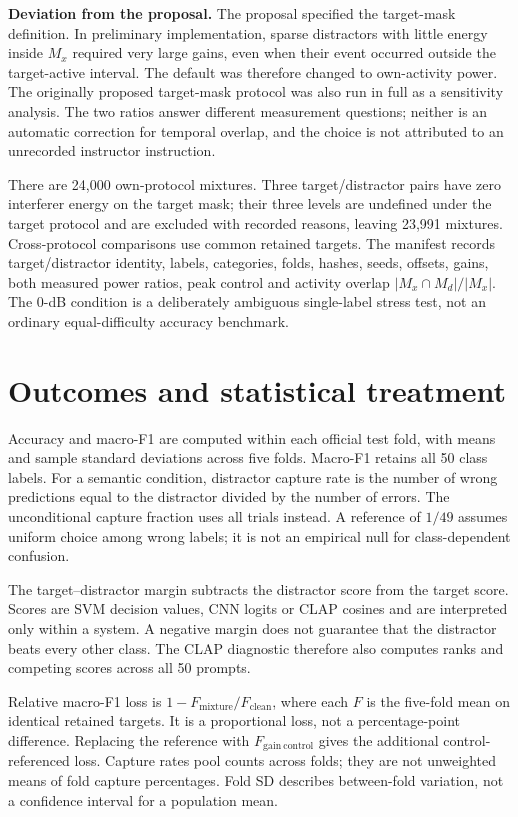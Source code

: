 \documentclass[a4paper,10pt]{article}
\begin{document}
\textbf{Deviation from the proposal.} The proposal specified the target-mask
definition. In preliminary implementation, sparse distractors with little
energy inside $M_x$ required very large gains, even when their event occurred
outside the target-active interval. The default was therefore changed to
own-activity power. The originally proposed target-mask protocol was also run
in full as a sensitivity analysis. The two ratios answer different measurement
questions; neither is an automatic correction for temporal overlap, and the
choice is not attributed to an unrecorded instructor instruction.

There are 24,000 own-protocol mixtures. Three target/distractor pairs have zero
interferer energy on the target mask; their three levels are undefined under
the target protocol and are excluded with recorded reasons, leaving 23,991
mixtures. Cross-protocol comparisons use common retained targets. The manifest
records target/distractor identity, labels, categories, folds, hashes, seeds,
offsets, gains, both measured power ratios, peak control and activity overlap
$|M_x\cap M_d|/|M_x|$. The 0-dB condition is a deliberately ambiguous
single-label stress test, not an ordinary equal-difficulty accuracy benchmark.

\section{Outcomes and statistical treatment}
Accuracy and macro-F1 are computed within each official test fold, with means
and sample standard deviations across five folds. Macro-F1 retains all 50 class
labels. For a semantic condition, distractor capture rate is the number of wrong
predictions equal to the distractor divided by the number of errors. The
unconditional capture fraction uses all trials instead. A reference of $1/49$
assumes uniform choice among wrong labels; it is not an empirical null for
class-dependent confusion.

The target--distractor margin subtracts the distractor score from the target
score. Scores are SVM decision values, CNN logits or CLAP cosines and are
interpreted only within a system. A negative margin does not guarantee that
the distractor beats every other class. The CLAP diagnostic therefore also
computes ranks and competing scores across all 50 prompts.

Relative macro-F1 loss is $1-F_{\mathrm{mixture}}/F_{\mathrm{clean}}$, where each
$F$ is the five-fold mean on identical retained targets. It is a proportional
loss, not a percentage-point difference. Replacing the reference with
$F_{\mathrm{gain\ control}}$ gives the additional control-referenced loss.
Capture rates pool counts across folds; they are not unweighted means of fold
capture percentages. Fold SD describes between-fold variation, not a confidence
interval for a population mean.
\end{document}
